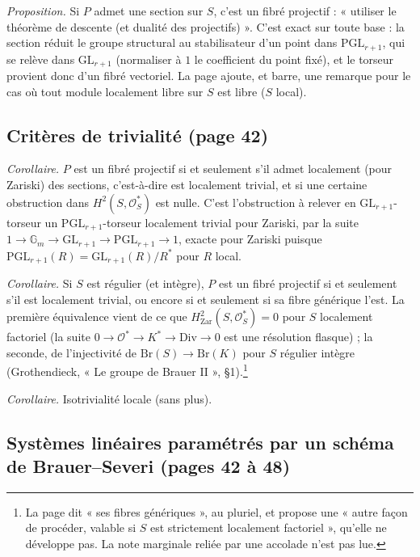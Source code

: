 \documentclass[11pt,a4paper]{article}
\begin{document}
\emph{Proposition.} Si $P$ admet une section sur $S$, c'est un fibré projectif
: « utiliser le théorème de descente (et dualité des projectifs) ». C'est
exact sur toute base : la section réduit le groupe structural au stabilisateur
d'un point dans $\mathrm{PGL}_{r+1}$, qui se relève dans $\mathrm{GL}_{r+1}$
(normaliser à $1$ le coefficient du point fixé), et le torseur provient donc
d'un fibré vectoriel. La page ajoute, et barre, une remarque pour le cas où
tout module localement libre sur $S$ est libre ($S$ local).

\subsection*{Critères de trivialité (page 42)}

\emph{Corollaire.} $P$ est un fibré projectif si et seulement s'il admet
localement (pour Zariski) des sections, c'est-à-dire est localement trivial,
et si une certaine obstruction dans $H^2(S, \mathcal{O}_S^{*})$ est nulle.
C'est l'obstruction à relever en $\mathrm{GL}_{r+1}$-torseur un
$\mathrm{PGL}_{r+1}$-torseur localement trivial pour Zariski, par la suite
$1 \to \mathbb{G}_m \to \mathrm{GL}_{r+1} \to \mathrm{PGL}_{r+1} \to 1$,
exacte pour Zariski puisque $\mathrm{PGL}_{r+1}(R) = \mathrm{GL}_{r+1}(R)/R^{*}$
pour $R$ local.

\emph{Corollaire.} Si $S$ est régulier (et intègre), $P$ est un fibré
projectif si et seulement s'il est localement trivial, ou encore si et
seulement si sa fibre générique l'est. La première équivalence vient de ce que
$H^2_{\mathrm{Zar}}(S, \mathcal{O}_S^{*}) = 0$ pour $S$ localement factoriel
(la suite $0 \to \mathcal{O}^{*} \to K^{*} \to \mathrm{Div} \to 0$ est une
résolution flasque) ; la seconde, de l'injectivité de $\mathrm{Br}(S) \to
\mathrm{Br}(K)$ pour $S$ régulier intègre (Grothendieck, « Le groupe de
Brauer II », §1).\footnote{La page dit « ses fibres génériques », au
pluriel, et propose une « autre façon de procéder, valable si $S$ est
strictement localement factoriel », qu'elle ne développe pas. La note
marginale reliée par une accolade n'est pas lue.}

\emph{Corollaire.} Isotrivialité locale (sans plus).

\subsection*{Systèmes linéaires paramétrés par un schéma de Brauer–Severi (pages 42 à 48)}
\end{document}
